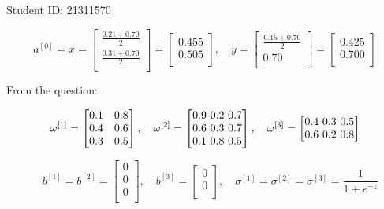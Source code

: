 \documentclass{article}
\begin{document}
Student ID: 21311570

\[
    a^{[0]} = x = \begin{bmatrix}
        \frac{0.21+0.70}{2} \\
        \frac{0.31+0.70}{2} \\
    \end{bmatrix}
    = \begin{bmatrix}
        0.455 \\
        0.505 \\
    \end{bmatrix},
    \quad
    y = \begin{bmatrix}
        \frac{0.15+0.70}{2} \\
        0.70                \\
    \end{bmatrix}
    = \begin{bmatrix}
        0.425 \\
        0.700 \\
    \end{bmatrix}
\]

From the question:

\[
    \omega^{[1]} = \begin{bmatrix}
        0.1 & 0.8 \\
        0.4 & 0.6 \\
        0.3 & 0.5 \\
    \end{bmatrix},
    \quad
    \omega^{[2]} = \begin{bmatrix}
        0.9 $ 0.2 $ 0.7 \\
        0.6 $ 0.3 $ 0.7 \\
        0.1 $ 0.8 $ 0.5 \\
    \end{bmatrix},
    \quad
    \omega^{[3]} = \begin{bmatrix}
        0.4 $ 0.3 $ 0.5 \\
        0.6 $ 0.2 $ 0.8 \\
    \end{bmatrix}
\]

\[
    \quad
    b^{[1]} = b^{[2]} = \begin{bmatrix}
        0 \\
        0 \\
        0 \\
    \end{bmatrix},
    \quad
    b^{[3]} = \begin{bmatrix}
        0 \\
        0 \\
    \end{bmatrix},
    \quad
    \sigma^{[1]} = \sigma^{[2]} = \sigma^{[3]} = \frac{1}{1+e^{-z}}
\]
\end{document}
